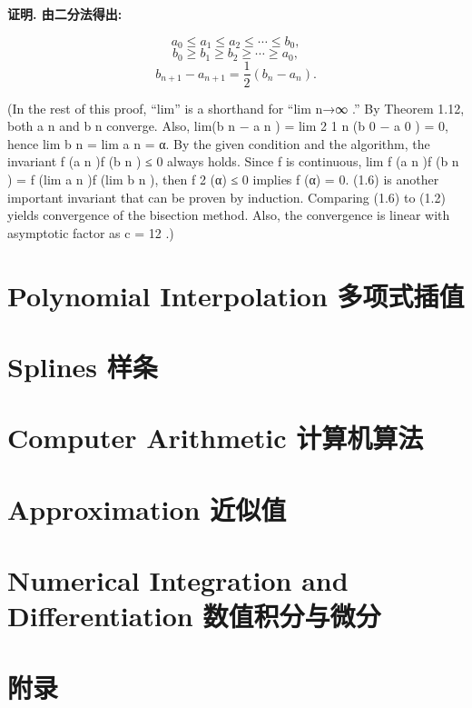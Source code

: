 \documentclass{ctexart}
\begin{document}
\textbf{证明. 由二分法得出:}

\[
a_0 \le a_1 \le a_2 \le \cdots \le b_0,
\]
\[
b_0 \ge b_1 \ge b_2 \ge \cdots \ge a_0,
\]
\[
b_{n+1}-a_{n+1} = \frac{1}{2}(b_n - a_n).
\]

(In the rest of this proof, “lim” is a shorthand for “lim n→∞ .” By Theorem 1.12, both {a n } and {b n } converge. Also, lim(b n − a n ) = lim 2 1 n (b 0 − a 0 ) = 0, hence lim b n = lim a n = α. By the given condition and the algorithm, the invariant f (a n )f (b n ) ≤ 0 always holds. Since f is continuous,
lim f (a n )f (b n ) = f (lim a n )f (lim b n ), then f 2 (α) ≤ 0 implies f (α) = 0. (1.6) is another important invariant that can be proven by induction. Comparing (1.6) to (1.2) yields convergence of the bisection method. Also, the convergence is linear with asymptotic factor as c = 12 .)
\section{Polynomial Interpolation 多项式插值}
\section{Splines 样条}
\section{Computer Arithmetic 计算机算法}
\section{Approximation 近似值}
\section{Numerical Integration and Differentiation 数值积分与微分}
\section{附录}
\end{document}
